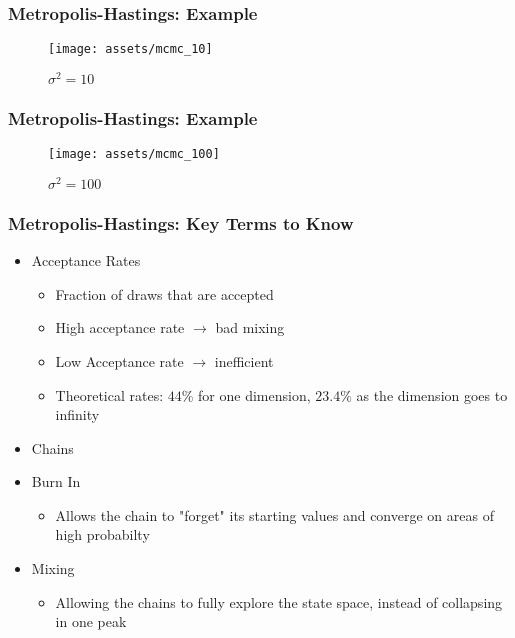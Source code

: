 \documentclass{beamer}
\begin{document}
\begin{frame}
  \frametitle{Metropolis-Hastings: Example}
  \begin{figure}
    \centering
    \texttt{[image: assets/mcmc\_10]}
    \caption{$\sigma^2 = 10$}
  \end{figure}
\end{frame}

\begin{frame}
  \frametitle{Metropolis-Hastings: Example}
  \begin{figure}
    \centering
    \texttt{[image: assets/mcmc\_100]}
    \caption{$\sigma^2 = 100$}
  \end{figure}
\end{frame}


\begin{frame}
\frametitle{Metropolis-Hastings: Key Terms to Know}
\begin{itemize}
  \item Acceptance Rates
  \begin{itemize}
    \item Fraction of draws that are accepted
    \item High acceptance rate $\rightarrow$ bad mixing
    \item Low Acceptance rate $\rightarrow$ inefficient
    \item Theoretical rates: $44\%$ for one dimension, $23.4\%$ as the dimension goes to infinity
  \end{itemize}
  \item Chains
  \item Burn In
  \begin{itemize}
    \item Allows the chain to "forget" its starting values and converge on areas of high probabilty
  \end{itemize}
  \item Mixing
  \begin{itemize}
    \item Allowing the chains to fully explore the state space, instead of collapsing
    in one peak
  \end{itemize}
\end{itemize}
\end{frame}


\end{document}
